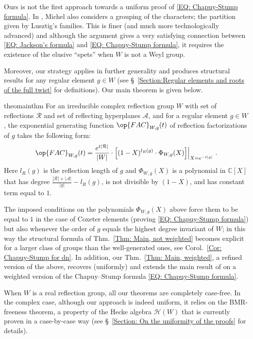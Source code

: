Ours is not the first approach towards a uniform proof of \eqref{EQ: Chapuy-Stump formula}. In \cite{michel-deligne-lusztig-derivation}, Michel also considers a grouping of the characters; the partition given by Lusztig's families. This is finer (and much more technologically advanced) and although the argument gives a very satisfying connection between \eqref{EQ: Jackson's formula} and \eqref{EQ: Chapuy-Stump formula}, it requires the existence of the elusive ``spets'' \cite{broue-malle-michel-split-spetses} when $W$ is not a Weyl group.

Moreover, our strategy applies in further generality and produces structural results for any regular element $g\in W$ (see \S~\ref{Section:Regular elements and roots of the full twist} for definitions). Our main theorem is given below.

\begin{restatable*}[]{theo}{mainthm}
\label{Thm: Main, not weighted}
For an irreducible complex reflection group $W$ with set of reflections $\mathcal{R}$ and set of reflecting hyperplanes $\mathcal{A}$, and for a regular element $g\in W$, the exponential generating function $\op{FAC}_{W,g}(t)$ of reflection factorizations of $g$ takes the following form:$$
\op{FAC}_{W,g}(t)=\dfrac{e^{t|\mathcal{R}|}}{|W|}\cdot \Big[ (1-X)^{l_R(g)}\cdot\Phi_{W,g}(X)\Big]\Big|_{X=e^{-t|g|}}\ .$$ Here $l_R(g)$ is the reflection length of $g$ and $\Phi_{W,g}(X)$ is a polynomial in $\mathbb{C}[X]$ that has degree $\frac{|\mathcal{R}|+|\mathcal{A}|}{|g|}-l_R(g)$, is not divisible by $(1-X)$, and has constant term equal to $1$.
\end{restatable*}


The imposed conditions on the polynomials $\Phi_{W,g}(X)$ above force them to be equal to $1$ in the case of Coxeter elements (proving \eqref{EQ: Chapuy-Stump formula}) but also whenever the order of $g$ equals the highest degree invariant of $W$; in this way the structural formula of Thm.~\ref{Thm: Main, not weighted} becomes explicit for a larger class of groups than the well-generated ones, see Corol.~\ref{Cor: Chapuy-Stump for dn}. 
In addition, our Thm.~\ref{Thm: Main, weighted}, a refined version of the above, recovers (uniformly) and extends the main result of \cite{reiner-delMas-Hameister} on a weighted version of the Chapuy--Stump formula \eqref{EQ: Chapuy-Stump formula}.



When $W$ is a real reflection group, all our theorems are completely case-free. In the complex case, although our approach is indeed uniform, it relies on the BMR-freeness theorem, a property of the Hecke algebra $\mathcal{H}(W)$ that is currently proven in a case-by-case way (see \S~\ref{Section: On the uniformity of the proofs} for details).


